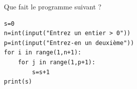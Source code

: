 \begin{exo}{}
	Que fait le programme suivant ?
	{\footnotesize
	\begin{lstlisting}
s=0
n=int(input("Entrez un entier > 0"))
p=int(input("Entrez-en un deuxième"))
for i in range(1,n+1):
    for j in range(1,p+1):
        s=s+1
print(s)
\end{lstlisting}
	}
\end{exo}

